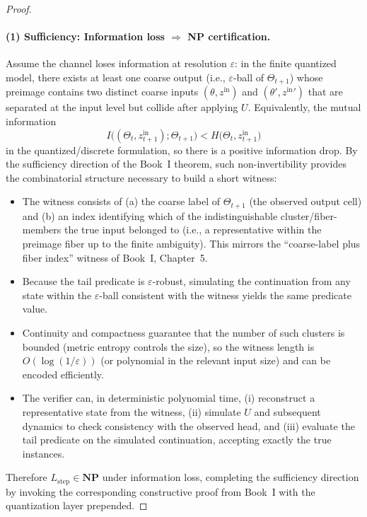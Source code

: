 \documentclass[12pt]{article}
\theoremstyle{definition}
\theoremstyle{plain}
\begin{document}
\begin{proof}
\paragraph{(1) Sufficiency: Information loss \(\Rightarrow\) NP certification.}  
Assume the channel loses information at resolution \(\varepsilon\): in the finite quantized model, there exists at least one coarse output (i.e., \(\varepsilon\)-ball of \(\Theta_{t+1}\)) whose preimage contains two distinct coarse inputs \((\theta,z^{\mathrm{in}})\) and \((\theta',z^{\mathrm{in}}{}')\) that are separated at the input level but collide after applying \(U\). Equivalently, the mutual information
\[
I\bigl((\Theta_t,z_{t+1}^{\mathrm{in}}); \Theta_{t+1}\bigr)
<
H\bigl(\Theta_t,z_{t+1}^{\mathrm{in}}\bigr)
\]
in the quantized/discrete formulation, so there is a positive information drop. By the sufficiency direction of the Book~I theorem, such non-invertibility provides the combinatorial structure necessary to build a short witness:
\begin{itemize}
    \item The witness consists of (a) the coarse label of \(\Theta_{t+1}\) (the observed output cell) and (b) an index identifying which of the indistinguishable cluster/fiber-members the true input belonged to (i.e., a representative within the preimage fiber up to the finite ambiguity). This mirrors the “coarse-label plus fiber index” witness of Book~I, Chapter~5.
    \item Because the tail predicate is \(\varepsilon\)-robust, simulating the continuation from any state within the \(\varepsilon\)-ball consistent with the witness yields the same predicate value.
    \item Continuity and compactness guarantee that the number of such clusters is bounded (metric entropy controls the size), so the witness length is \(O(\log(1/\varepsilon))\) (or polynomial in the relevant input size) and can be encoded efficiently.
    \item The verifier can, in deterministic polynomial time, (i) reconstruct a representative state from the witness, (ii) simulate \(U\) and subsequent dynamics to check consistency with the observed head, and (iii) evaluate the tail predicate on the simulated continuation, accepting exactly the true instances.
\end{itemize}
Therefore \(L_{\mathrm{step}}\in\mathbf{NP}\) under information loss, completing the sufficiency direction by invoking the corresponding constructive proof from Book~I with the quantization layer prepended.


\end{proof}
\end{document}
